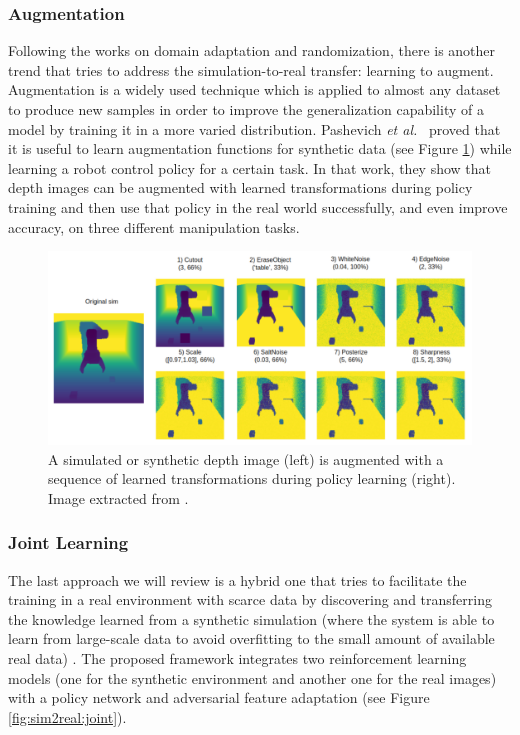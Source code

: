 \clearpage

\subsubsection{Augmentation}

Following the works on domain adaptation and randomization, there is another trend that tries to address the simulation-to-real transfer: learning to augment. Augmentation is a widely used technique which is applied to almost any dataset to produce new samples in order to improve the generalization capability of a model by training it in a more varied distribution. Pashevich \emph{et al.}~\cite{Pashevich2019} proved that it is useful to learn augmentation functions for synthetic data (see Figure \ref{fig:sim2real:aug}) while learning a robot control policy for a certain task. In that work, they show that depth images can be augmented with learned transformations during policy training and then use that policy in the real world successfully, and even improve accuracy, on three different manipulation tasks.

\begin{figure}[!htb]
    \centering
    \includegraphics[width=\linewidth]{Figures/Sim2Real/aug.png}
    \caption{A simulated or synthetic depth image (left) is augmented with a sequence of learned transformations during policy learning (right). Image extracted from \cite{Pashevich2019}.}
    \label{fig:sim2real:aug}
\end{figure}


\subsubsection{Joint Learning}

The last approach we will review is a hybrid one that tries to facilitate the training in a real environment with scarce data by discovering and transferring the knowledge learned from a synthetic simulation (where the system is able to learn from large-scale data to avoid overfitting to the small amount of available real data) \cite{Zhu2019}. The proposed framework integrates two reinforcement learning models (one for the synthetic environment and another one for the real images) with a policy network and adversarial feature adaptation (see Figure \ref{fig:sim2real:joint}).

